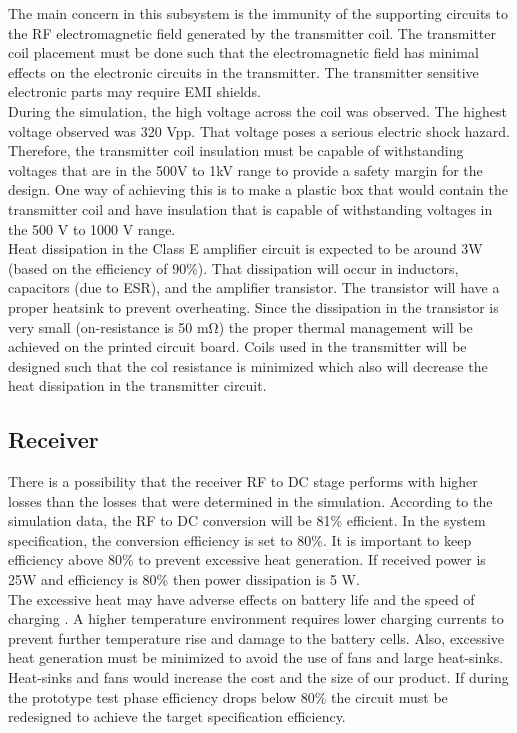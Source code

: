 \documentclass[12pt]{article}
\begin{document}
\indent
The main concern in this subsystem is the immunity of the supporting circuits to the RF electromagnetic field generated by the transmitter coil. The transmitter coil placement must be done such that the electromagnetic field has minimal effects on the electronic circuits in the transmitter. The transmitter sensitive electronic parts may require EMI shields.\\

\indent
During the simulation, the high voltage across the coil was observed. The highest voltage observed was 320 Vpp. That voltage poses a serious electric shock hazard. Therefore, the transmitter coil insulation must be capable of withstanding voltages that are in the 500V to 1kV range to provide a safety margin for the design. One way of achieving this is to make a plastic box that would contain the transmitter coil and have insulation that is capable of withstanding voltages in the 500 V to 1000 V range.  \\

\indent
Heat dissipation in the Class E amplifier circuit is expected to be around 3W (based on the efficiency of 90\%). That dissipation will occur in inductors, capacitors (due to ESR), and the amplifier transistor. The transistor will have a proper heatsink to prevent overheating. Since the dissipation in the transistor is very small (on-resistance is 50 mΩ) the proper thermal management will be achieved on the printed circuit board. Coils used in the transmitter will be designed such that the col resistance is minimized which also will decrease the heat dissipation in the transmitter circuit.

\subsection{Receiver}

\noindent \noindent
There is a possibility that the receiver RF to DC stage performs with higher losses than the losses that were determined in the simulation. According to the simulation data, the RF to DC conversion will be 81\% efficient. In the system specification, the conversion efficiency is set to 80\%. It is important to keep efficiency above 80\% to prevent excessive heat generation. If received power is 25W and efficiency is  80\% then power dissipation is 5 W.   \\

\indent
The excessive heat may have adverse effects on battery life and the speed of charging \cite{TPSM265R1}. A higher temperature environment requires lower charging currents to prevent further temperature rise and damage to the battery cells. Also, excessive heat generation must be minimized to avoid the use of fans and large heat-sinks. Heat-sinks and fans would increase the cost and the size of our product.   If during the prototype test phase efficiency drops below 80\% the circuit must be redesigned to achieve the target specification efficiency. \\
\end{document}
